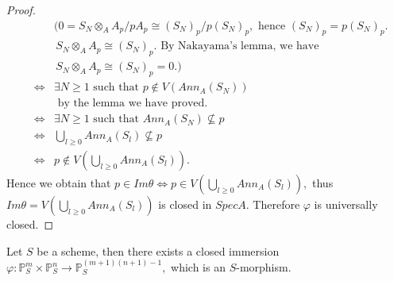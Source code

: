 \begin{proof}
\begin{eqnarray*}
& & (0=S_N\otimes_A A_p/pA_p\cong (S_N)_p/p(S_N)_p,\text{ hence }
(S_N)_p=p(S_N)_p.                                                 \\
& & \, S_N\otimes_A A_p\cong (S_N)_p.\text{ By Nakayama's lemma,
we have }                                                         \\
& & \, S_N\otimes_A A_p\cong (S_N)_p=0.)                          \\
& \Longleftrightarrow & \exists N\geqslant 1 \text{ such that }
p\not\in V(Ann_A(S_N))                                            \\
& & \text{ by the lemma we have proved.}                          \\
& \Longleftrightarrow & \exists N\geqslant 1 \text{ such that }
Ann_A(S_N)\nsubseteq p                                            \\
& \Longleftrightarrow & \bigcup_{l\geqslant0}Ann_A(S_l)\nsubseteq p\\
& \Longleftrightarrow & p\not\in V(\bigcup_{l\geqslant0}Ann_A(S_l)).
\end{eqnarray*}
Hence we obtain that $p\in Im\theta\Longleftrightarrow p\in
V(\bigcup_{l\geqslant0}Ann_A(S_l)),$ thus
$Im\theta=V(\bigcup_{l\geqslant0}Ann_A(S_l))$ is closed in $SpecA.$
Therefore $\varphi$ is universally closed.
\end{proof}
\begin{prop}
Let $S$ be a scheme, then there exists a closed immersion $\varphi:
\mathbb{P}_S^m\times\mathbb{P}_S^n\rightarrow
\mathbb{P}_S^{(m+1)(n+1)-1},$ which is an $S$-morphism.
\end{prop}
